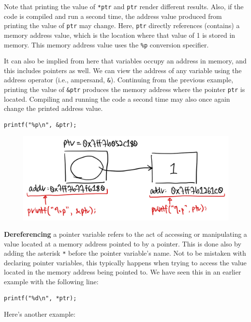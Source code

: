 Note that printing the value of \verb|*ptr| and \verb|ptr| render different results.
Also, if the code is compiled and run a second time, the address value produced from printing the value of \verb|ptr| may change.
Here, \verb|ptr| directly references (contains) a memory address value, which is the location where that value of 1 is stored in memory.
This memory address value uses the \verb|%p| conversion specifier.

It can also be implied from here that variables occupy an address in memory, and this includes pointers as well.
We can view the address of any variable using the address operator (i.e., ampersand, \verb|&|).
Continuing from the previous example, printing the value of \verb|&ptr| produces the memory address where the pointer \verb|ptr| is located.
Compiling and running the code a second time may also once again change the printed address value.

\begin{verbatim}
printf("%p\n", &ptr);
\end{verbatim}

\begin{figure}
    \includegraphics[width=\linewidth]{pointers.jpg}
\end{figure}

\textbf{Dereferencing} a pointer variable refers to the act of accessing or manipulating a value located at a memory address pointed to by a pointer.
This is done also by adding the asterisk \verb|*| before the pointer variable's name.
Not to be mistaken with declaring pointer variables, this typically happens when trying to access the value located in the memory address being pointed to.
We have seen this in an earlier example with the following line:

\begin{verbatim}
printf("%d\n", *ptr);
\end{verbatim}

Here's another example:

